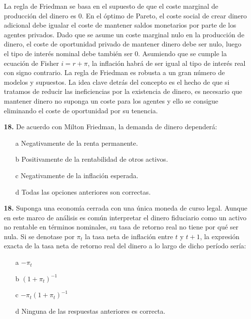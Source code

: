 \documentclass{nuevotema}
\begin{document}
La regla de Friedman se basa en el supuesto de que el coste marginal de producción del dinero es 0. En el óptimo de Pareto, el coste social de crear dinero adicional debe igualar el coste de mantener saldos monetarios por parte de los agentes privados. Dado que se asume un coste marginal nulo en la producción de dinero, el coste de oportunidad privado de mantener dinero debe ser nulo, luego el tipo de interés nominal debe también ser 0. Asumiendo que se cumple la ecuación de Fisher $i=r+\pi$, la inflación habrá de ser igual al tipo de interés real con signo contrario. La regla de Friedman es robusta a un gran número de modelos y supuestos. La idea clave detrás del concepto es el hecho de que si tratamos de reducir las ineficiencias por la existencia de dinero, es necesario que mantener dinero no suponga un coste para los agentes y ello se consigue eliminando el coste de oportunidad por su tenencia.

\preguntas

\textbf{18.} De acuerdo con Milton Friedman, la demanda de dinero dependerá:

\begin{itemize}
	\item[a] Negativamente de la renta permanente.
	\item[b] Positivamente de la rentabilidad de otros activos.
	\item[c] Negativamente de la inflación esperada.
	\item[d] Todas las opciones anteriores son correctas.
\end{itemize}


\textbf{18.} Suponga una economía cerrada con una única moneda de curso legal. Aunque en este marco de análisis es común interpretar el dinero fiduciario como un activo no rentable en términos nominales, su tasa de retorno real no tiene por qué ser nula. Si se denotase por $\pi_t$ la tasa neta de inflación entre $t$ y $t+1$, la expresión exacta de la tasa neta de retorno real del dinero a lo largo de dicho período sería:

\begin{itemize}
	\item[a] $-\pi_t$
	\item[b] $(1+\pi_t)^{-1}$
	\item[c] $-\pi_t(1+\pi_t)^{-1}$
	\item[d] Ninguna de las respuestas anteriores es correcta.
\end{itemize}
\end{document}
